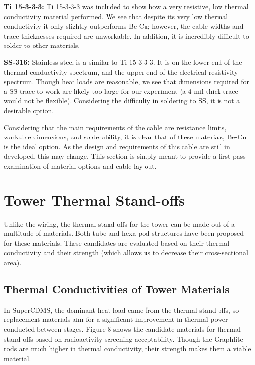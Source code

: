 \documentclass{report}
\begin{document}
\textbf{Ti 15-3-3-3:} Ti 15-3-3-3 was included to show how a very resistive, low thermal conductivity material performed. We see that despite its very low thermal conductivity it only slightly outperforms Be-Cu; however, the cable widths and trace thicknesses required are unworkable. In addition, it is incredibly difficult to solder to other materials. 

\textbf{SS-316:} Stainless steel is a similar to Ti 15-3-3-3. It is on the lower end of the thermal conductivity spectrum, and the upper end of the electrical resistivity spectrum. Though heat loads are reasonable, we see that dimensions required for a SS trace to work are likely too large for our experiment (a 4 mil thick trace would not be flexible). Considering the difficulty in soldering to SS, it is not a desirable option.

Considering that the main requirements of the cable are resistance limits, workable dimensions, and solderability, it is clear that of these materials, Be-Cu is the ideal option. As the design and requirements of this cable are still in developed, this may change. This section is simply meant to provide a first-pass examination of material options and cable lay-out. 


\section{Tower Thermal Stand-offs}
Unlike the wiring, the thermal stand-offs for the tower can be made out of a multitude of materials. Both tube and hexa-pod structures have been proposed for these materials. These candidates are evaluated based on their thermal conductivity and their strength (which allows us to decrease their cross-sectional area).

\subsection{Thermal Conductivities of Tower Materials}
In SuperCDMS, the dominant heat load came from the thermal stand-offs, so replacement materials aim for a significant improvement in thermal power conducted between stages. Figure 8 shows the candidate materials for thermal stand-offs based on radioactivity screening acceptability. Though the Graphlite rods are much higher in thermal conductivity, their strength makes them a viable material.
\end{document}

